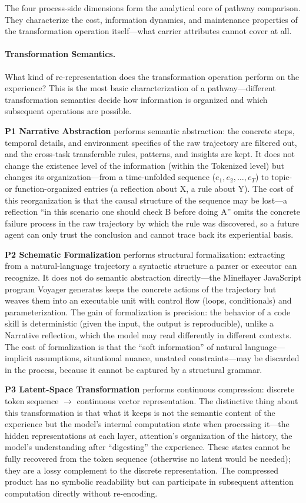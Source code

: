 The four process-side dimensions form the analytical core of pathway comparison. They characterize the cost, information dynamics, and maintenance properties of the transformation operation itself---what carrier attributes cannot cover at all.

\paragraph{Transformation Semantics.} What kind of re-representation does the transformation operation perform on the experience? This is the most basic characterization of a pathway---different transformation semantics decide how information is organized and which subsequent operations are possible.

\textbf{P1 Narrative Abstraction} performs semantic abstraction: the concrete steps, temporal details, and environment specifics of the raw trajectory are filtered out, and the cross-task transferable rules, patterns, and insights are kept. It does not change the existence level of the information (within the Tokenized level) but changes its organization---from a time-unfolded sequence ($e_1, e_2, \dots, e_T$) to topic- or function-organized entries (a reflection about X, a rule about Y). The cost of this reorganization is that the causal structure of the sequence may be lost---a reflection ``in this scenario one should check B before doing A'' omits the concrete failure process in the raw trajectory by which the rule was discovered, so a future agent can only trust the conclusion and cannot trace back its experiential basis.

\textbf{P2 Schematic Formalization} performs structural formalization: extracting from a natural-language trajectory a syntactic structure a parser or executor can recognize. It does not do semantic abstraction directly---the Mineflayer JavaScript program Voyager generates keeps the concrete actions of the trajectory but weaves them into an executable unit with control flow (loops, conditionals) and parameterization. The gain of formalization is precision: the behavior of a code skill is deterministic (given the input, the output is reproducible), unlike a Narrative reflection, which the model may read differently in different contexts. The cost of formalization is that the ``soft information'' of natural language---implicit assumptions, situational nuance, unstated constraints---may be discarded in the process, because it cannot be captured by a structural grammar.

\textbf{P3 Latent-Space Transformation} performs continuous compression: discrete token sequence $\rightarrow$ continuous vector representation. The distinctive thing about this transformation is that what it keeps is not the semantic content of the experience but the model's internal computation state when processing it---the hidden representations at each layer, attention's organization of the history, the model's understanding after ``digesting'' the experience. These states cannot be fully recovered from the token sequence (otherwise no latent would be needed); they are a lossy complement to the discrete representation. The compressed product has no symbolic readability but can participate in subsequent attention computation directly without re-encoding.


